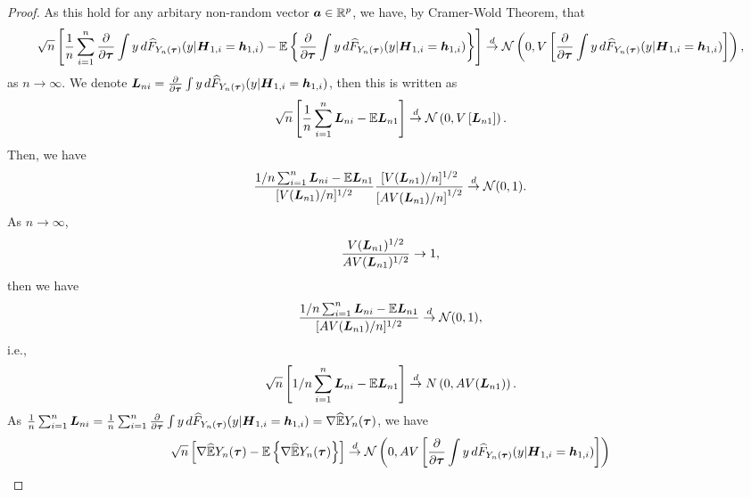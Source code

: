 \documentclass[../main.tex]{subfiles}
\begin{document}
\begin{proof}
As this hold for any arbitary non-random vector $\boldsymbol{a}\in \mathbb{R}^p$, we have, by Cramer-Wold Theorem, that
\begin{gather*}
\sqrt{n}\lt[\mean[n] \pard[\bs{\tau}]\int y \,d  \wh{F}_{Y_n(\bs{\tau})}(y | \bs{H}_{1,i} = \bs{h}_{1,i}) -\mathbb{E}\lt\{ \pard[\bs{\tau}]\int y \,d  \wh{F}_{Y_n(\bs{\tau})}(y | \bs{H}_{1,i} = \bs{h}_{1,i})\rt\}\rt]\overset{d}{\to}\mathcal{N}\lt(0,V\lt[\pard[\bs{\tau}]\int y \,d  \wh{F}_{Y_n(\bs{\tau})}(y | \bs{H}_{1,i} = \bs{h}_{1,i})\rt]\rt),
\end{gather*}
as $n \to \infty$. We denote $\bs{L}_{ni}= \pard[\bs{\tau}]\int y \,d  \wh{F}_{Y_n(\bs{\tau})}(y | \bs{H}_{1,i} = \bs{h}_{1,i})$,
then this is written as
\begin{gather*}
\sqrt{n}\left[\frac{1}{n}\sum_{i=1}^{n}\boldsymbol{L}_{ni}-\mathbb{E}\boldsymbol{L}_{n1}\right]\overset{d}{\to}\mathcal{N}\left(0,V\left[\boldsymbol{L}_{n1}\right]\right).
\end{gather*}
Then, we have
\begin{gather*}
\frac{1/n\sum_{i=1}^{n}\boldsymbol{L}_{ni}-\mathbb{E}\boldsymbol{L}_{n1}}{[V(\boldsymbol{L}_{n1})/n]^{1/2}}\frac{[V(\boldsymbol{L}_{n1})/n]^{1/2}}{\left[AV(\boldsymbol{L}_{n1})/n\right]^{1/2}}\overset{d}{\to}\mathcal{N}(0,1).
\end{gather*}
As  $n \to \infty$, 
\begin{gather*}
\frac{V(\boldsymbol{L}_{n1})^{1/2}}{AV(\boldsymbol{L}_{n1})^{1/2}}\to1,
\end{gather*}
then we have
\begin{gather*}
\frac{1/n\sum_{i=1}^{n}\boldsymbol{L}_{ni}-\mathbb{E}\boldsymbol{L}_{n1}}{[AV(\boldsymbol{L}_{n1})/n]^{1/2}}\overset{d}{\to}\mathcal{N}(0,1),
\end{gather*}
i.e.,
\begin{gather*}
\sqrt{n}\left[1/n\sum_{i=1}^{n}\boldsymbol{L}_{ni}-\mathbb{E}\boldsymbol{L}_{n1}\right]\overset{d}{\to}N\left(0,AV(\boldsymbol{L}_{n1})\right).
\end{gather*}
As $\frac{1}{n}\sum_{i=1}^{n}\bs{L}_{ni} =\mean[n] \pard[\bs{\tau}]\int y \,d  \wh{F}_{Y_n(\bs{\tau})}(y | \bs{H}_{1,i} = \bs{h}_{1,i}) = \nabla \wh{\mb{E}} Y_n(\bs{\tau})$, we have
\begin{gather}
\begin{flalign*}
\sqrt{n}\lt[\nabla \wh{\mb{E}} Y_n(\bs{\tau})  -\mathbb{E}\lt\{\nabla \wh{\mb{E}} Y_n(\bs{\tau})\rt\}\rt]\overset{d}{\to}\mathcal{N}\lt(0,AV\lt[\pard[\bs{\tau}] \int y \,d  \wh{F}_{Y_n(\bs{\tau})}(y | \bs{H}_{1,i} = \bs{h}_{1,i}) \rt]\rt)
\end{flalign*}
\end{gather}
\end{proof}
\end{document}
